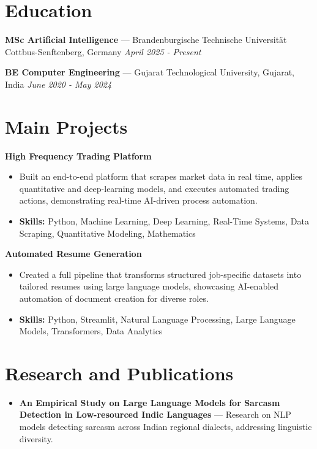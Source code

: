 \documentclass[a4paper,10pt]{article}
\begin{document}
\section*{Education}
\textbf{MSc Artificial Intelligence} — Brandenburgische Technische Universität Cottbus-Senftenberg, Germany \hfill \textit{April 2025 - Present}\par
\vspace{1.5pt}
\textbf{BE Computer Engineering} — Gujarat Technological University, Gujarat, India \hfill \textit{June 2020 - May 2024}\par

\section*{Main Projects}
\textbf{High Frequency Trading Platform}\par
\vspace{1pt}
\begin{itemize}
  \item Built an end-to-end platform that scrapes market data in real time, applies quantitative and deep-learning models, and executes automated trading actions, demonstrating real-time AI-driven process automation.
  \item \textbf{Skills:} Python, Machine Learning, Deep Learning, Real-Time Systems, Data Scraping, Quantitative Modeling, Mathematics
\end{itemize}
\vspace{3pt}
\textbf{Automated Resume Generation}\par
\vspace{1pt}
\begin{itemize}
  \item Created a full pipeline that transforms structured job-specific datasets into tailored resumes using large language models, showcasing AI-enabled automation of document creation for diverse roles.
  \item \textbf{Skills:} Python, Streamlit, Natural Language Processing, Large Language Models, Transformers, Data Analytics
\end{itemize}

\section*{Research and Publications}
\begin{itemize}
\item \textbf{An Empirical Study on Large Language Models for Sarcasm Detection in Low-resourced Indic Languages} — Research on NLP models detecting sarcasm across Indian regional dialects, addressing linguistic diversity.
\end{itemize}
\end{document}
